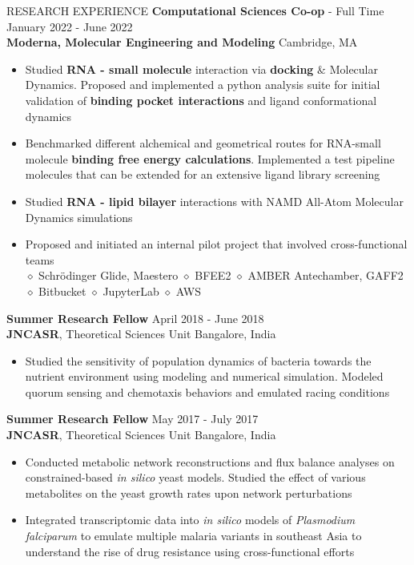 \documentclass{resume} %
\begin{document}
\begin{rSection}{RESEARCH EXPERIENCE}
   \textbf{Computational Sciences Co-op} - Full Time \hfill January 2022 - June 2022\\
   \textbf{Moderna, Molecular Engineering and Modeling} \hfill {Cambridge, MA}
   \begin{itemize}
      \itemsep -1pt {}
      \item Studied \textbf{RNA - small molecule} interaction via \textbf{docking} $\&$ Molecular Dynamics. Proposed and implemented a python analysis suite for initial validation of \textbf{binding pocket interactions} and ligand conformational dynamics
      \item Benchmarked different alchemical and geometrical routes for RNA-small molecule \textbf{binding free energy calculations}. Implemented a test pipeline molecules that can be extended for an extensive ligand library screening
      \item Studied \textbf{RNA - lipid bilayer} interactions with NAMD All-Atom Molecular Dynamics simulations
      \item  Proposed and initiated an internal pilot project that involved cross-functional teams \\
            $\diamond$ Schr{\"o}dinger Glide, Maestero $\diamond$  BFEE2 $\diamond$ AMBER Antechamber, GAFF2 $\diamond$ Bitbucket $\diamond$ JupyterLab $\diamond$ AWS
   \end{itemize}

   \textbf{Summer Research Fellow} \hfill April 2018 - June 2018\\
   \textbf{JNCASR}, Theoretical Sciences Unit \hfill {Bangalore, India}
   \begin{itemize}
      \itemsep -1pt {}
      \item Studied the sensitivity of population dynamics of bacteria towards the nutrient environment using modeling and numerical simulation. Modeled quorum sensing and chemotaxis behaviors and emulated racing conditions
   \end{itemize}

   \textbf{Summer Research Fellow} \hfill May 2017 - July 2017\\
   \textbf{JNCASR}, Theoretical Sciences Unit \hfill {Bangalore, India}
   \begin{itemize}
      \itemsep -1pt {}
      \item Conducted metabolic network reconstructions and flux balance analyses on constrained-based \textit{in silico} yeast models. Studied the effect of various metabolites on the yeast growth rates upon network perturbations
      \item Integrated transcriptomic data into \textit{in silico} models of \textit{Plasmodium falciparum} to emulate multiple malaria variants in southeast Asia to understand the rise of drug resistance using cross-functional efforts
   \end{itemize}

\end{rSection}
\end{document}
